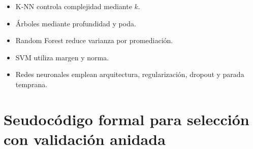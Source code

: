 \documentclass[
  spanish,
  10.5pt,
  letterpaper,
  DIV=11,
  numbers=noendperiod,
  oneside,
  open=any]{scrreprt}
\providecommand{\tightlist}{%
  \setlength{\itemsep}{0pt}\setlength{\parskip}{0pt}}
\theoremstyle{definition}
\theoremstyle{definition}
\theoremstyle{plain}
\theoremstyle{remark}
\begin{document}

\begin{itemize}
\tightlist
\item
  K-NN controla complejidad mediante \(k\).
\item
  Árboles mediante profundidad y poda.
\item
  Random Forest reduce varianza por promediación.
\item
  SVM utiliza margen y norma.
\item
  Redes neuronales emplean arquitectura, regularización, dropout y
  parada temprana.
\end{itemize}

\section*{Seudocódigo formal para selección con validación
anidada}\label{seudocuxf3digo-formal-para-selecciuxf3n-con-validaciuxf3n-anidada}

\end{document}
